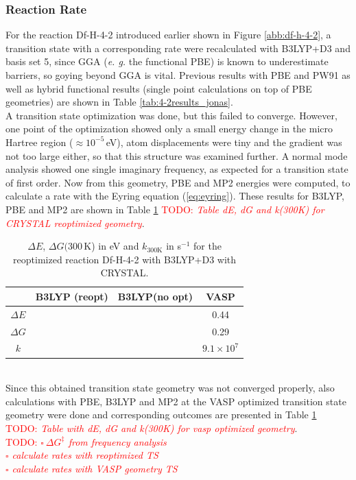 \documentclass[11pt,DIV=13,BCOR=5mm,a4paper,headinclude]{scrbook}
\newcommand\todo[1]{\textcolor{red}{TODO: \textit{{#1}}}}
\begin{document}
\subsubsection{Reaction Rate}
For the reaction Df-H-4-2 introduced earlier shown in Figure \ref{abb:df-h-4-2}, a transition state with a corresponding rate were recalculated with B3LYP+D3 and basis set 5, since GGA (\textit{e.
g.} the functional PBE) is known to underestimate barriers\cite{Zhao05}, so goying beyond GGA is vital.
Previous results with PBE and PW91 as well as hybrid functional results (single point calculations on top of PBE geometries) are shown in Table \ref{tab:4-2results_jonas}.
\\
A transition state optimization was done, but this failed to converge.
However, one point of the optimization showed only a small energy change in the micro Hartree region ($\approx 10^{-5}\,$eV), atom displacements were tiny and the gradient was not too large either, so that this structure was examined further.
A normal mode analysis showed one single imaginary frequency, as expected for a transition state of first order.
Now from this geometry, PBE and MP2 energies were computed, to calculate a rate with the Eyring equation (\ref{eq:eyring}).
These results for B3LYP, PBE and MP2 are shown in Table \ref{tab:k_crystal-reopt+noopt} \todo{Table dE, dG and k(300K) for CRYSTAL reoptimized geometry}.
\begin{table}[!h]
  \centering
  \caption{$\Delta E$, $\Delta G(300\,$K) in eV and $k_\textrm{300K}$ in s$^{-1}$ for the reoptimized reaction Df-H-4-2 with B3LYP+D3 with CRYSTAL.}
  \begin{tabular}{c|ccc}
  \toprule
   &B3LYP (reopt)&B3LYP(no opt)&VASP\\\midrule
   $\Delta E$ & & &0.44\\
   $\Delta G$ & & &0.29\\
   $k$ & & &$9.1\times 10^7$\\\bottomrule
  \end{tabular}
  \label{tab:k_crystal-reopt+noopt}
\end{table}
\\
Since this obtained transition state geometry was not converged properly, also calculations with PBE, B3LYP and MP2 at the VASP optimized transition state geometry were done and corresponding  outcomes are presented in Table \ref{tab:k_crystal-reopt+noopt} \todo{Table with dE, dG and k(300K) for vasp optimized geometry}.
\\
\todo{
$\square~ \Delta G^\ddagger$ from frequency analysis\\
$\square$ calculate rates with reoptimized TS\\
$\square$ calculate rates with VASP geometry TS
} 
 
\end{document}

